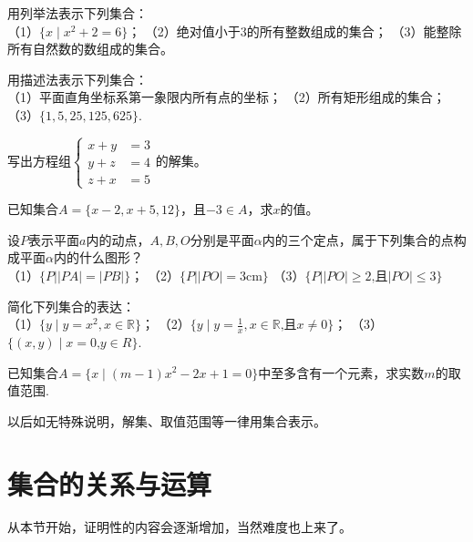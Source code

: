 \documentclass[lang=cn,math=cm,chinesefont=nofont,11pt,scheme=chinese,onecol]{elegantbook}
\begin{document}
\begin{exercise}\label{exer:3}
  用列举法表示下列集合：\\
  （1）$\{x\mid x^2+2=6\}$；
  （2）绝对值小于3的所有整数组成的集合；
  （3）能整除所有自然数的数组成的集合。
\end{exercise}

\begin{exercise}\label{exer:4}
  用描述法表示下列集合：\\
  （1）平面直角坐标系第一象限内所有点的坐标；
  （2）所有矩形组成的集合；
  （3）$\{1,5,25,125,625\}$.
\end{exercise}

\begin{exercise}\label{exer:5}
  写出方程组$\left.\left\{\begin{aligned}x+y&=3\\y+z&=4\\z+x&=5\end{aligned}\right.\right.$的解集。
\end{exercise}

\begin{exercise}\label{exer:6}
  已知集合$A=\{x-2,x+5,12\}$，且$-3\in A$，求$x$的值。
\end{exercise}

\begin{exercise}\label{exer:7}
  设$P$表示平面$a$内的动点，$A,B,O$分别是平面$\alpha$内的三个定点，属于下列集合的点构成平面$\alpha$内的什么图形？\\
  （1）$\{P||PA|=|PB|\}$；
  （2）$\{P||PO|=3\text{cm}\}$
  （3）$\{P||PO|\geqslant2\text{,且}|PO|\leqslant3\}$
\end{exercise}

\begin{exercise}\label{exer:8}
  简化下列集合的表达：\\
  （1）$\{y\mid y=x^2,x\in\mathbb{R}\}$；
  （2）$\{y\mid y=\frac{1}{x},x\in\mathbb{R}\text{,且}x\neq0\}$；
  （3）$\{(x,y)\mid x=0\text{,}y\in R\}$.
\end{exercise}

\begin{exercise}\label{exer:9}
  已知集合$A=\{x\mid(m-1)x^2-2x+1=0\}$中至多含有一个元素，求实数$m$的取值范围.
\end{exercise}
\begin{remark}
  以后如无特殊说明，解集、取值范围等一律用集合表示。
\end{remark}

\section{集合的关系与运算}
从本节开始，证明性的内容会逐渐增加，当然难度也上来了。
\end{document}
